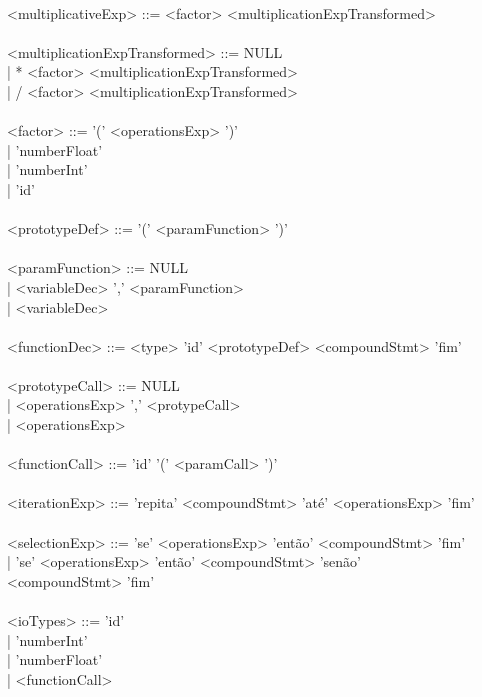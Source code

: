 \documentclass[12pt,a4paper,final]{report}
\newcommand\tab[1][1cm]{\hspace*{#1}}
\begin{document}
\\
<multiplicativeExp> ::= <factor> <multiplicationExpTransformed>\\
\\
<multiplicationExpTransformed> ::= NULL\\
\tab \tab \tab \tab \tab \tab| * <factor> <multiplicationExpTransformed>\\
\tab \tab \tab \tab \tab \tab| / <factor> <multiplicationExpTransformed>\\
\\
<factor> ::= '(' <operationsExp> ')'\\
\tab \tab | 'numberFloat'\\
\tab \tab | 'numberInt'\\
\tab \tab | 'id'\\
\\
<prototypeDef> ::= '(' <paramFunction> ')'\\
\\
<paramFunction> ::= NULL\\
\tab \tab \tab | <variableDec> ',' <paramFunction>\\
\tab \tab \tab | <variableDec>\\
\\
<functionDec> ::= <type> 'id' <prototypeDef> <compoundStmt> 'fim'\\
\\
<prototypeCall> ::= NULL\\
\tab \tab \tab | <operationsExp> ',' <protypeCall>\\
\tab \tab \tab | <operationsExp>\\
\\
<functionCall> ::= 'id' '(' <paramCall> ')' \\
\\
<iterationExp> ::= 'repita' <compoundStmt> 'até' <operationsExp> 'fim'\\
\\
<selectionExp> ::= 'se' <operationsExp> 'então' <compoundStmt> 'fim'\\
\tab \tab \tab | 'se' <operationsExp> 'então' <compoundStmt> 'senão'\\ <compoundStmt> 'fim'\\
\\
<ioTypes> ::= 'id'\\
\tab \tab | 'numberInt'\\
\tab \tab | 'numberFloat'\\
\tab \tab | <functionCall>\\
\\
\end{document}
